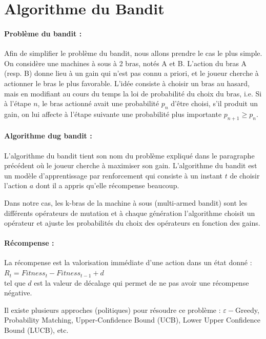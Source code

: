 \documentclass[12pt]{article}
\begin{document}
\section{Algorithme du Bandit}
\paragraph{Problème du bandit : } Afin de simplifier le problème du bandit, nous allons prendre le cas le plus simple. On considère une machines à sous à 2 bras, notés A et B. L’action du bras A (resp. B) donne lieu à un gain qui n'est pas connu a priori, et le joueur cherche à actionner le bras le plus favorable. L'idée consiste à choisir un bras au hasard, mais en modifiant au cours du temps la loi de probabilité du choix du bras, i.e. Si à l’étape $ n $, le bras actionné avait une probabilité $ p_n $ d’être choisi, s’il produit un gain, on lui affecte à l’étape suivante une probabilité plus importante $ p_{n+1} \ge p_n $.

\paragraph{Algorithme dug
 bandit : } L'algorithme du bandit tient son nom du problème expliqué dans le paragraphe précédent où le joueur cherche à maximiser son gain. L'algorithme du bandit est un modèle d'apprentissage par renforcement qui consiste à un instant $ t $ de choisir l'action $ a $ dont il a appris qu'elle récompense beaucoup.\\

\par Dans notre cas, les k-bras de la machine à sous (multi-armed bandit) sont les différents opérateurs de mutation et à chaque génération l'algorithme choisit un opérateur et ajuste les probabilités du choix des opérateurs en fonction des gains.

\paragraph{Récompense : } La récompense est la valorisation immédiate d’une action dans un état donné : $ R_t = Fitness_t - Fitness_{t-1} + d $ \\tel que $ d $ est la valeur de décalage qui permet de ne pas avoir une récompense négative.\\

\par Il existe plusieurs approches (politiques) pour résoudre ce problème : $ \varepsilon- $Greedy, Probability Matching, Upper-Confidence Bound (UCB), Lower Upper Confidence Bound (LUCB), etc.\\
\end{document}
